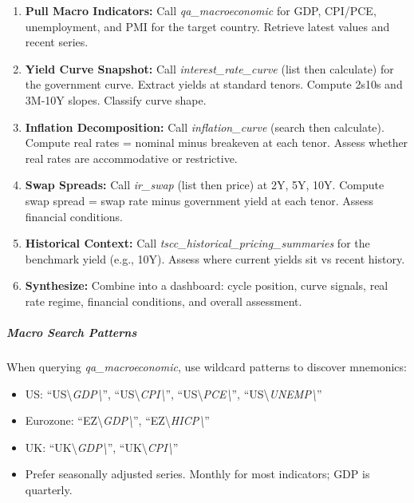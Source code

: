 \documentclass[11pt]{article}
\begin{document}
\begin{enumerate}[leftmargin=*,itemsep=2pt,topsep=2pt]
\item {} \textbf{Pull Macro Indicators:} Call \emph{qa\_\allowbreak{}macroeconomic} for GDP, CPI/PCE, unemployment, and PMI for the target country. Retrieve latest values and recent series.
\item {} \textbf{Yield Curve Snapshot:} Call \emph{interest\_\allowbreak{}rate\_\allowbreak{}curve} (list then calculate) for the government curve. Extract yields at standard tenors. Compute 2s10s and 3M-10Y slopes. Classify curve shape.
\item {} \textbf{Inflation Decomposition:} Call \emph{inflation\_\allowbreak{}curve} (search then calculate). Compute real rates = nominal minus breakeven at each tenor. Assess whether real rates are accommodative or restrictive.
\item {} \textbf{Swap Spreads:} Call \emph{ir\_\allowbreak{}swap} (list then price) at 2Y, 5Y, 10Y. Compute swap spread = swap rate minus government yield at each tenor. Assess financial conditions.
\item {} \textbf{Historical Context:} Call \emph{tscc\_\allowbreak{}historical\_\allowbreak{}pricing\_\allowbreak{}summaries} for the benchmark yield (e.g., 10Y). Assess where current yields sit vs recent history.
\item {} \textbf{Synthesize:} Combine into a dashboard: cycle position, curve signals, real rate regime, financial conditions, and overall assessment.
\end{enumerate}

\subparagraph{Macro Search Patterns}\mbox{}\par

When querying \emph{qa\_\allowbreak{}macroeconomic}, use wildcard patterns to discover mnemonics:

\begin{itemize}[leftmargin=*,itemsep=2pt,topsep=2pt]
\item {} US: ``US\textbackslash{}\emph{GDP\textbackslash{}}'', ``US\textbackslash{}\emph{CPI\textbackslash{}}'', ``US\textbackslash{}\emph{PCE\textbackslash{}}'', ``US\textbackslash{}\emph{UNEMP\textbackslash{}}''
\item {} Eurozone: ``EZ\textbackslash{}\emph{GDP\textbackslash{}}'', ``EZ\textbackslash{}\emph{HICP\textbackslash{}}''
\item {} UK: ``UK\textbackslash{}\emph{GDP\textbackslash{}}'', ``UK\textbackslash{}\emph{CPI\textbackslash{}}''
\item {} Prefer seasonally adjusted series. Monthly for most indicators; GDP is quarterly.
\end{itemize}
\end{document}
